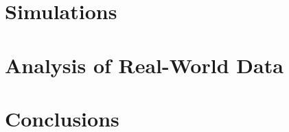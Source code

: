 \documentclass[11pt,oneside]{report}
\theoremstyle{definition}
\begin{document}
\chapter{Simulations}


%


\chapter{Analysis of Real-World Data}



\chapter{Conclusions}




\end{document}
